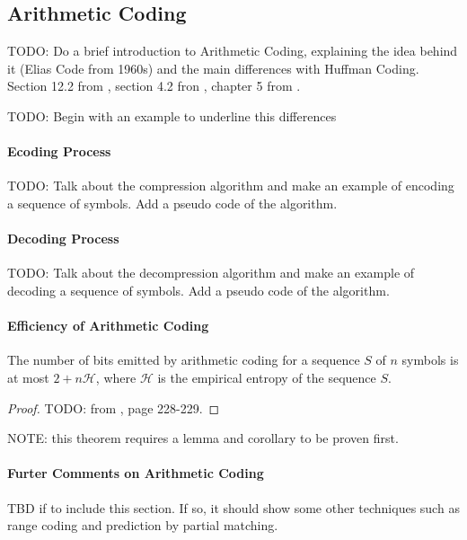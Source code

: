 \subsection{Arithmetic Coding}

TODO: Do a brief introduction to Arithmetic Coding, explaining the idea behind it (Elias Code from 1960s) and the main differences with Huffman Coding. Section 12.2 from \cite{ferragina2023pearls}, section 4.2 fron \cite{han2002mathematics}, chapter 5 from \cite{sayood2002lossless}.

\begin{example}
    TODO: Begin with an example to underline this differences
\end{example}

\paragraph{Ecoding Process} TODO: Talk about the compression algorithm and make an example of encoding a sequence of symbols. Add a pseudo code of the algorithm.\\

\paragraph{Decoding Process}
TODO: Talk about the decompression algorithm and make an example of decoding a sequence of symbols. Add a pseudo code of the algorithm.\\

\paragraph{Efficiency of Arithmetic Coding}
\begin{theorem}
    The number of bits emitted by arithmetic coding for a sequence $S$ of $n$ symbols is at most $2 + n\mathcal{H}$, where $\mathcal{H}$ is the empirical entropy of the sequence $S$.
\end{theorem}
\begin{proof}
    TODO: from \cite{ferragina2023pearls}, page 228-229.
\end{proof}
\noindent NOTE: this theorem requires a lemma and corollary to be proven first.

\paragraph{Furter Comments on Arithmetic Coding} TBD if to include this section. If so, it should show some other techniques such as range coding and prediction by partial matching.
